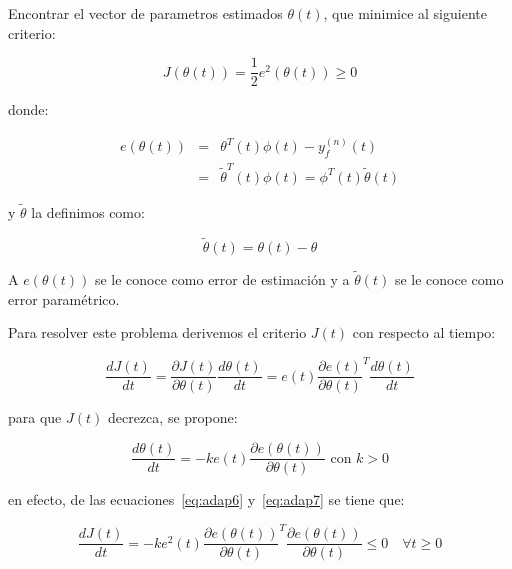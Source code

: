            \begin{problema}
                Encontrar el vector de parametros estimados $\theta(t)$, que minimice al siguiente criterio:

                \begin{equation}
                    J \left( \theta(t) \right) = \frac{1}{2} e^2 \left( \theta(t) \right) \ge 0
                \end{equation}

                donde:

                \begin{eqnarray}
                    e \left( \theta(t) \right) & = & \theta^T(t) \phi(t) - y_f^{(n)}(t) \nonumber \\
                    & = & \tilde{\theta}^T(t) \phi(t) = \phi^T(t) \tilde{\theta}(t)
                \end{eqnarray}

                y $\tilde{\theta}$ la definimos como:

                \begin{equation}
                    \tilde{\theta}(t) = \theta(t) - \theta
                \end{equation}

                A $e \left( \theta(t) \right)$ se le conoce como error de estimación y a $\tilde{\theta}(t)$ se le conoce como error paramétrico.
            \end{problema}

            Para resolver este problema derivemos el criterio $J(t)$ con respecto al tiempo:

            \begin{equation} \label{eq:adap6}
                \frac{d J(t)}{dt} = \frac{\partial J(t)}{\partial \theta(t)} \frac{d \theta(t)}{dt} = e(t) \frac{\partial e(t)}{\partial \theta(t)}^T \frac{d \theta(t)}{dt}
            \end{equation}

            para que $J(t)$ decrezca, se propone:

            \begin{equation}\label{eq:adap7}
                \frac{d \theta(t)}{dt} = -k e(t) \frac{\partial e(\theta(t))}{\partial \theta(t)} \text{ con } k > 0
            \end{equation}

            en efecto, de las ecuaciones~\ref{eq:adap6} y~\ref{eq:adap7} se tiene que:

            \begin{equation*}
                \frac{d J(t)}{dt} = -k e^2(t) \frac{\partial e(\theta(t))}{\partial \theta(t)}^T \frac{\partial e(\theta(t))}{\partial \theta(t)} \le 0 \quad \forall t \ge 0
            \end{equation*}

